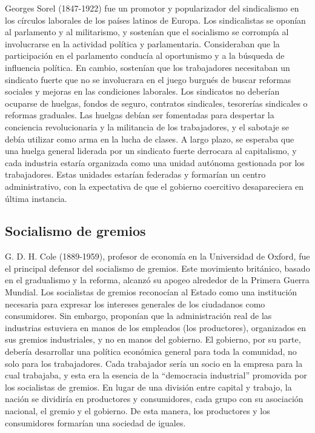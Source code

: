 \documentclass[
  jou,
  floatsintext,
  longtable,
  a4paper,
  nolmodern,
  notxfonts,
  notimes,
  12pt,
  colorlinks=true,linkcolor=blue,citecolor=blue,urlcolor=blue]{apa7}
\begin{document}
Georges Sorel (1847-1922) fue un promotor y popularizador del
sindicalismo en los círculos laborales de los países latinos de Europa.
Los sindicalistas se oponían al parlamento y al militarismo, y sostenían
que el socialismo se corrompía al involucrarse en la actividad política
y parlamentaria. Consideraban que la participación en el parlamento
conducía al oportunismo y a la búsqueda de influencia política. En
cambio, sostenían que los trabajadores necesitaban un sindicato fuerte
que no se involucrara en el juego burgués de buscar reformas sociales y
mejoras en las condiciones laborales. Los sindicatos no deberían
ocuparse de huelgas, fondos de seguro, contratos sindicales, tesorerías
sindicales o reformas graduales. Las huelgas debían ser fomentadas para
despertar la conciencia revolucionaria y la militancia de los
trabajadores, y el sabotaje se debía utilizar como arma en la lucha de
clases. A largo plazo, se esperaba que una huelga general liderada por
un sindicato fuerte derrocara al capitalismo, y cada industria estaría
organizada como una unidad autónoma gestionada por los trabajadores.
Estas unidades estarían federadas y formarían un centro administrativo,
con la expectativa de que el gobierno coercitivo desapareciera en última
instancia.

\subsection{Socialismo de gremios}\label{socialismo-de-gremios}

G. D. H. Cole (1889-1959), profesor de economía en la Universidad de
Oxford, fue el principal defensor del socialismo de gremios. Este
movimiento británico, basado en el gradualismo y la reforma, alcanzó su
apogeo alrededor de la Primera Guerra Mundial. Los socialistas de
gremios reconocían al Estado como una institución necesaria para
expresar los intereses generales de los ciudadanos como consumidores.
Sin embargo, proponían que la administración real de las industrias
estuviera en manos de los empleados (los productores), organizados en
sus gremios industriales, y no en manos del gobierno. El gobierno, por
su parte, debería desarrollar una política económica general para toda
la comunidad, no solo para los trabajadores. Cada trabajador sería un
socio en la empresa para la cual trabajaba, y esta era la esencia de la
``democracia industrial'' promovida por los socialistas de gremios. En
lugar de una división entre capital y trabajo, la nación se dividiría en
productores y consumidores, cada grupo con su asociación nacional, el
gremio y el gobierno. De esta manera, los productores y los consumidores
formarían una sociedad de iguales.
\end{document}
